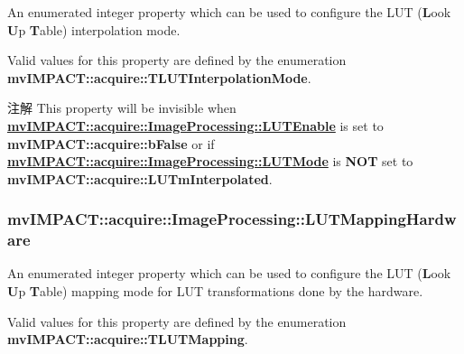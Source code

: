 An enumerated integer property which can be used to configure the L\+U\+T ({\bfseries L}ook {\bfseries U}p {\bfseries T}able) interpolation mode. 

Valid values for this property are defined by the enumeration {\bfseries mv\+I\+M\+P\+A\+C\+T\+::acquire\+::\+T\+L\+U\+T\+Interpolation\+Mode}.

\begin{DoxyNote}{注解}
This property will be invisible when {\bfseries \hyperlink{classmv_i_m_p_a_c_t_1_1acquire_1_1_image_processing_a7f8eb83578d97fde3405e6ae5d09e5c3}{mv\+I\+M\+P\+A\+C\+T\+::acquire\+::\+Image\+Processing\+::\+L\+U\+T\+Enable}} is set to {\bfseries mv\+I\+M\+P\+A\+C\+T\+::acquire\+::b\+False} or if {\bfseries \hyperlink{classmv_i_m_p_a_c_t_1_1acquire_1_1_image_processing_ae2f3059a3574e6a08a2d4348f1d5a152}{mv\+I\+M\+P\+A\+C\+T\+::acquire\+::\+Image\+Processing\+::\+L\+U\+T\+Mode}} is {\bfseries N\+O\+T} set to {\bfseries mv\+I\+M\+P\+A\+C\+T\+::acquire\+::\+L\+U\+Tm\+Interpolated}. 
\end{DoxyNote}
\hypertarget{classmv_i_m_p_a_c_t_1_1acquire_1_1_image_processing_ac6ef8a5f6168be4ebcdfe5c0d3e2d311}{
\subsubsection[{L\+U\+T\+Mapping\+Hardware}]{ mv\+I\+M\+P\+A\+C\+T\+::acquire\+::\+Image\+Processing\+::\+L\+U\+T\+Mapping\+Hardware}}\label{classmv_i_m_p_a_c_t_1_1acquire_1_1_image_processing_ac6ef8a5f6168be4ebcdfe5c0d3e2d311}


An enumerated integer property which can be used to configure the L\+U\+T ({\bfseries L}ook {\bfseries U}p {\bfseries T}able) mapping mode for L\+U\+T transformations done by the hardware. 

Valid values for this property are defined by the enumeration {\bfseries mv\+I\+M\+P\+A\+C\+T\+::acquire\+::\+T\+L\+U\+T\+Mapping}.

